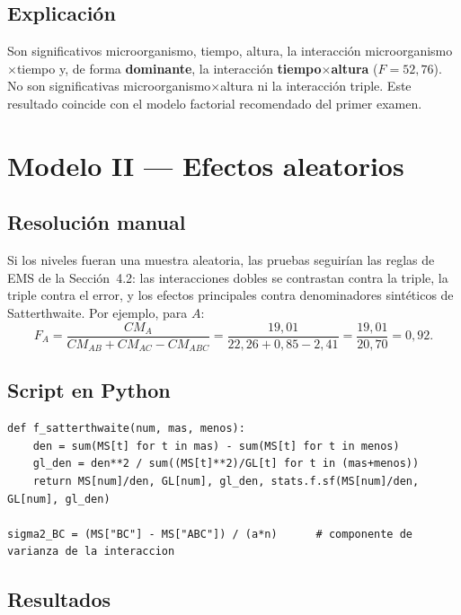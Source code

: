 \documentclass[12pt,a4paper]{article}
\begin{document}
\subsection{Explicación}

Son significativos microorganismo, tiempo, altura, la interacción microorganismo$\times$tiempo y, de forma \textbf{dominante}, la interacción \textbf{tiempo$\times$altura} ($F=52{,}76$). No son significativas microorganismo$\times$altura ni la interacción triple. Este resultado coincide con el modelo factorial recomendado del primer examen.

\section{Modelo II --- Efectos aleatorios}

\subsection{Resolución manual}

Si los niveles fueran una muestra aleatoria, las pruebas seguirían las reglas de EMS de la Sección~4.2: las interacciones dobles se contrastan contra la triple, la triple contra el error, y los efectos principales contra denominadores sintéticos de Satterthwaite. Por ejemplo, para $A$:
\[
F_A=\frac{CM_A}{CM_{AB}+CM_{AC}-CM_{ABC}}=\frac{19{,}01}{22{,}26+0{,}85-2{,}41}=\frac{19{,}01}{20{,}70}=0{,}92 .
\]

\subsection{Script en Python}

\begin{lstlisting}[caption={Pruebas F del modelo aleatorio y componentes de varianza.}]
def f_satterthwaite(num, mas, menos):
    den = sum(MS[t] for t in mas) - sum(MS[t] for t in menos)
    gl_den = den**2 / sum((MS[t]**2)/GL[t] for t in (mas+menos))
    return MS[num]/den, GL[num], gl_den, stats.f.sf(MS[num]/den, GL[num], gl_den)

sigma2_BC = (MS["BC"] - MS["ABC"]) / (a*n)      # componente de varianza de la interaccion
\end{lstlisting}

\subsection{Resultados}
\end{document}
